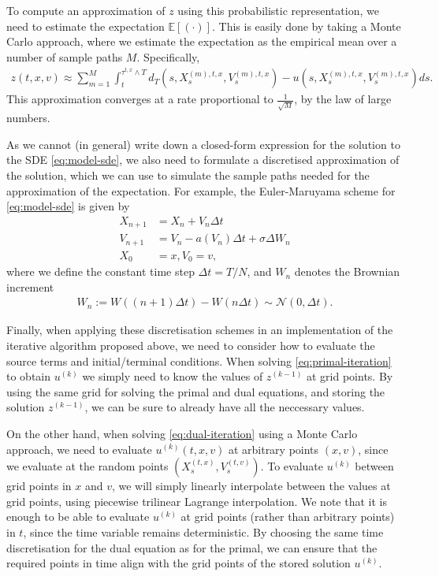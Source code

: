 To compute an approximation of $z$ using this probabilistic representation, we need to estimate the expectation $\mathbb{E}[(\cdot)]$. This is easily done by taking a Monte Carlo approach, where we estimate the expectation as the empirical mean over a number of sample paths $M$. Specifically,
%
\begin{align}
    \label{eq:dual-mc-approx}
    z(t,x,v) \approx \sum_{m=1}^{M} \int_t^{\tau^{t,x}\wedge T} d_T(s,X_s^{(m),t,x},V_s^{(m),t,x}) - u(s,X_s^{(m),t,x},V_s^{(m),t,x}) ds . 
\end{align}
%
This approximation converges at a rate proportional to $\frac{1}{\sqrt{M}}$, by the law of large numbers. 

As we cannot (in general) write down a closed-form expression for the solution to the SDE \autoref{eq:model-sde}, we also need to formulate a discretised approximation of the solution, which we can use to simulate the sample paths needed for the approximation of the expectation. For example, the Euler-Maruyama scheme for \autoref{eq:model-sde} is given by
%
\begin{align}
    X_{n+1} &= X_n + V_n \Delta t \\
    V_{n+1} &= V_n - a(V_n)\Delta t + \sigma \Delta W_n \\
    X_0 &= x, V_0 = v,
\end{align}
%
where we define the constant time step $\Delta t = T/N$, and $W_n$ denotes the Brownian increment
%
\begin{align} 
    W_n := W((n+1)\Delta t) - W(n\Delta t) \sim \mathcal{N}(0,\Delta t).
\end{align}
%

Finally, when applying these discretisation schemes in an implementation of the iterative algorithm proposed above, we need to consider how to evaluate the source terms and initial/terminal conditions. When solving \autoref{eq:primal-iteration} to obtain $u^{(k)}$ we simply need to know the values of $z^{(k-1)}$ at grid points. By using the same grid for solving the primal and dual equations, and storing the solution $z^{(k-1)}$, we can be sure to already have all the neccessary values.

On the other hand, when solving \autoref{eq:dual-iteration} using a Monte Carlo approach, we need to evaluate $u^{(k)}(t,x,v)$ at arbitrary points $(x,v)$, since we evaluate at the random points $(X_s^{(t,x)},V_s^{(t,v)})$. To evaluate $u^{(k)}$ between grid points in $x$ and $v$, we will simply linearly interpolate between the values at grid points, using piecewise trilinear Lagrange interpolation.
We note that it is enough to be able to evaluate $u^{(k)}$ at grid points (rather than arbitrary points) in $t$, since the time variable remains deterministic. By choosing the same time discretisation for the dual equation as for the primal, we can ensure that the required points in time align with the grid points of the stored solution $u^{(k)}$. 

